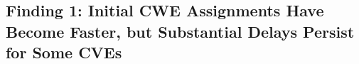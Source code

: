 \documentclass[conference,compsoc]{IEEEtran}
\begin{document}


\subsection{Finding 1: Initial CWE Assignments Have Become Faster, but Substantial Delays Persist for Some CVEs}
\end{document}
